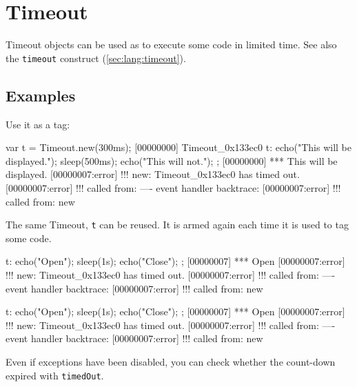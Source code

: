
\section{Timeout}

Timeout objects can be used as  to execute some code in
limited time.  See also the \lstinline|timeout| construct
(\autoref{sec:lang:timeout}).

\subsection{Examples}

Use it as a tag:

\begin{urbiscript}
var t = Timeout.new(300ms);
[00000000] Timeout_0x133ec0
t:{
  echo("This will be displayed.");
  sleep(500ms);
  echo("This will not.");
};
[00000000] *** This will be displayed.
[00000007:error] !!! new: Timeout_0x133ec0 has timed out.
[00000007:error] !!!    called from: ---- event handler backtrace:
[00000007:error] !!!    called from: new
\end{urbiscript}

The same Timeout, \lstinline|t| can be reused.  It is armed again each
time it is used to tag some code.

\begin{urbiscript}
t: { echo("Open"); sleep(1s); echo("Close"); };
[00000007] *** Open
[00000007:error] !!! new: Timeout_0x133ec0 has timed out.
[00000007:error] !!!    called from: ---- event handler backtrace:
[00000007:error] !!!    called from: new

t: { echo("Open"); sleep(1s); echo("Close"); };
[00000007] *** Open
[00000007:error] !!! new: Timeout_0x133ec0 has timed out.
[00000007:error] !!!    called from: ---- event handler backtrace:
[00000007:error] !!!    called from: new
\end{urbiscript}

Even if exceptions have been disabled, you can check whether the
count-down expired with \lstinline|timedOut|.

